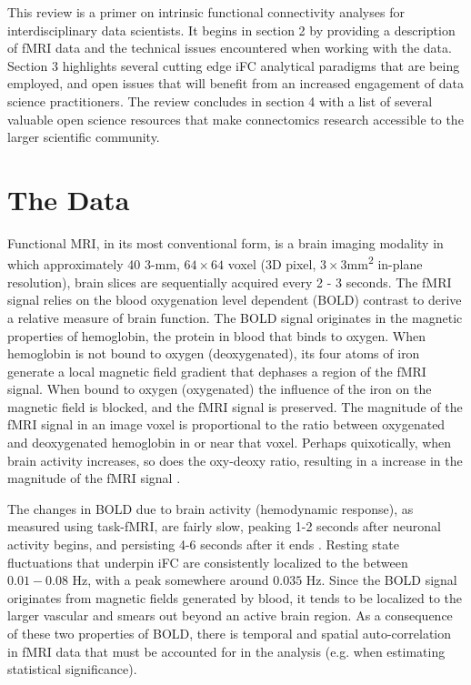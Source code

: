 This review is a primer on intrinsic functional connectivity analyses for interdisciplinary data scientists. It begins in section 2 by providing a description of fMRI data and the technical issues encountered when working with the data. Section 3 highlights several cutting edge iFC analytical paradigms that are being employed, and open issues that will benefit from an increased engagement of data science practitioners. The review concludes in section 4 with a list of several valuable open science resources that make connectomics research accessible to the larger scientific community.

\section{The Data}

Functional MRI, in its most conventional form, is a brain imaging modality in which approximately 40 3-\si{\milli\meter}, $64 \times 64$ voxel (3D pixel, $3\times3$\si{\milli\meter\squared} in-plane resolution), brain slices are sequentially acquired every 2 - 3 seconds. The fMRI signal relies on the blood oxygenation level dependent (BOLD) contrast to derive a relative measure of brain function. The BOLD signal originates in the magnetic properties of hemoglobin, the protein in blood that binds to oxygen. When hemoglobin is not bound to oxygen (deoxygenated), its four atoms of iron generate a local magnetic field gradient that dephases a region of the fMRI signal. When bound to oxygen (oxygenated) the influence of the iron on the magnetic field is blocked, and the fMRI signal is preserved. The magnitude of the fMRI signal in an image voxel is proportional to the ratio between oxygenated and deoxygenated hemoglobin in or near that voxel. Perhaps quixotically, when brain activity increases, so does the oxy-deoxy ratio, resulting in a increase in the magnitude of the fMRI signal \cite{fmribook}. 

The changes in BOLD due to brain activity (hemodynamic response), as measured using task-fMRI, are fairly slow, peaking 1-2 seconds after neuronal activity begins, and persisting 4-6 seconds after it ends \cite{fmribook}. Resting state fluctuations that underpin iFC are consistently localized to the between $0.01-0.08$ \si{\hertz}, with a peak somewhere around $0.035$ \si{\hertz}\cite{biswal,cordes}. Since the BOLD signal originates from magnetic fields generated by blood, it tends to be localized to the larger vascular and smears out beyond an active brain region. As a consequence of these two properties of BOLD, there is temporal and spatial auto-correlation in fMRI data that must be accounted for in the analysis (e.g. when estimating statistical significance).

